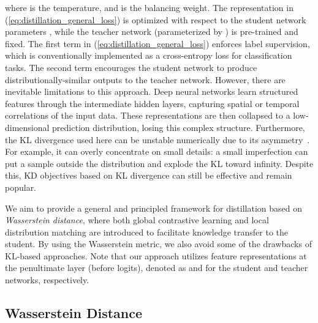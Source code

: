\documentclass[final]{cvpr}
\theoremstyle{definition}
\begin{document}
where  is the temperature, and  is the balancing weight.
The representation in (\ref{eq:distillation_general_loss}) is optimized with respect to the student network parameters , while the teacher network (parameterized by ) is pre-trained and fixed. The first term in (\ref{eq:distillation_general_loss}) enforces label supervision, which is conventionally implemented as a cross-entropy loss for classification tasks. The second term encourages the student network to produce distributionally-similar outputs to the teacher network. However, there are inevitable limitations to this approach. Deep neural networks learn structured features through the intermediate hidden layers, capturing spatial or temporal correlations of the input data.
These representations are then collapsed to a low-dimensional prediction distribution, losing this complex structure.
Furthermore, 
the KL divergence used here can be unstable numerically due to its asymmetry~\cite{chen2017symmetric, ozair2019wasserstein}. For example, it can overly concentrate on small details: a small imperfection can put a sample outside the distribution and explode the KL toward infinity.
Despite this, KD objectives based on KL divergence can still be effective and remain popular.









We aim to provide a general and principled framework for distillation based on \emph{Wasserstein distance}, 
where both global contrastive learning and local distribution matching are introduced to facilitate  knowledge transfer to the student.
By using the Wasserstein metric, we also avoid some of the drawbacks of KL-based approaches.
Note that our approach utilizes feature representations at the penultimate layer (before logits), denoted as  and  for the student and teacher networks, respectively.


\subsection{Wasserstein Distance}\label{subsec:wasserstein_intro}
\end{document}
